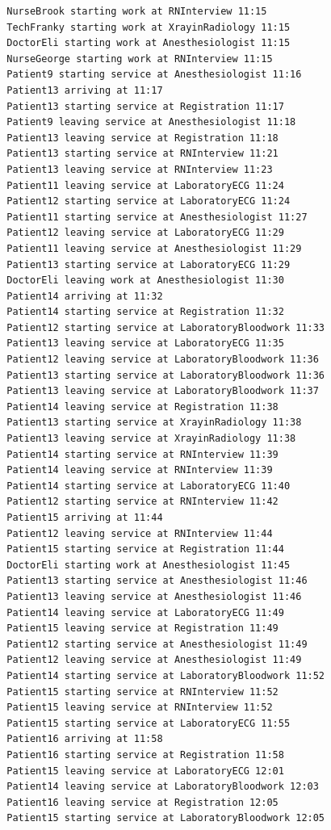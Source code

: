 \documentclass[12pt]{article}
\begin{document}
\begin{verbatim}
		NurseBrook starting work at RNInterview 11:15
		TechFranky starting work at XrayinRadiology 11:15
		DoctorEli starting work at Anesthesiologist 11:15
		NurseGeorge starting work at RNInterview 11:15
		Patient9 starting service at Anesthesiologist 11:16
		Patient13 arriving at 11:17
		Patient13 starting service at Registration 11:17
		Patient9 leaving service at Anesthesiologist 11:18
		Patient13 leaving service at Registration 11:18
		Patient13 starting service at RNInterview 11:21
		Patient13 leaving service at RNInterview 11:23
		Patient11 leaving service at LaboratoryECG 11:24
		Patient12 starting service at LaboratoryECG 11:24
		Patient11 starting service at Anesthesiologist 11:27
		Patient12 leaving service at LaboratoryECG 11:29
		Patient11 leaving service at Anesthesiologist 11:29
		Patient13 starting service at LaboratoryECG 11:29
		DoctorEli leaving work at Anesthesiologist 11:30
		Patient14 arriving at 11:32
		Patient14 starting service at Registration 11:32
		Patient12 starting service at LaboratoryBloodwork 11:33
		Patient13 leaving service at LaboratoryECG 11:35
		Patient12 leaving service at LaboratoryBloodwork 11:36
		Patient13 starting service at LaboratoryBloodwork 11:36
		Patient13 leaving service at LaboratoryBloodwork 11:37
		Patient14 leaving service at Registration 11:38
		Patient13 starting service at XrayinRadiology 11:38
		Patient13 leaving service at XrayinRadiology 11:38
		Patient14 starting service at RNInterview 11:39
		Patient14 leaving service at RNInterview 11:39
		Patient14 starting service at LaboratoryECG 11:40
		Patient12 starting service at RNInterview 11:42
		Patient15 arriving at 11:44
		Patient12 leaving service at RNInterview 11:44
		Patient15 starting service at Registration 11:44
		DoctorEli starting work at Anesthesiologist 11:45
		Patient13 starting service at Anesthesiologist 11:46
		Patient13 leaving service at Anesthesiologist 11:46
		Patient14 leaving service at LaboratoryECG 11:49
		Patient15 leaving service at Registration 11:49
		Patient12 starting service at Anesthesiologist 11:49
		Patient12 leaving service at Anesthesiologist 11:49
		Patient14 starting service at LaboratoryBloodwork 11:52
		Patient15 starting service at RNInterview 11:52
		Patient15 leaving service at RNInterview 11:52
		Patient15 starting service at LaboratoryECG 11:55
		Patient16 arriving at 11:58
		Patient16 starting service at Registration 11:58
		Patient15 leaving service at LaboratoryECG 12:01
		Patient14 leaving service at LaboratoryBloodwork 12:03
		Patient16 leaving service at Registration 12:05
		Patient15 starting service at LaboratoryBloodwork 12:05

\end{verbatim}
\end{document}
